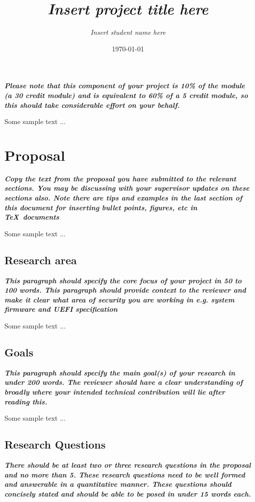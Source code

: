\documentclass{article} %
\title{\emph{Insert project title here}}  %
\author{\emph{Insert student name here}} %
\date{\today}
\newcommand{\hint}[1] {\par {\bfseries \color{Blue} \it #1 \par}}
\begin{document}
\maketitle
\hint{Please note that this component of your project is 10\% of the module (a 30 credit module) and is equivalent to 60\% of a 5 credit module, so this should take considerable effort on your behalf.}
Some sample text ...

\section{Proposal}
\hint{Copy the text from the proposal you have submitted to the relevant sections. You may be discussing with your supervisor updates on these sections also. Note there are tips and examples in the last section of this document for inserting bullet points, figures, etc in \TeX\ documents}

Some sample text ...

\subsection{Research area}
\hint{This paragraph should specify the core focus of your project in 50 to 100 words. This paragraph should provide context to the reviewer and make it clear what area of security you are working in e.g. system firmware and UEFI specification}

Some sample text ...

\subsection{Goals}
\hint{This paragraph should specify the main goal(s) of your research in under 200 words. The reviewer should have a clear understanding of broadly where your intended technical contribution will lie after reading this.}

Some sample text ...

\subsection{Research Questions}
\hint{There should be at least two or three research questions in the proposal and no more than 5. These research questions need to be well formed and answerable in a quantitative manner. These questions should concisely stated and should be able to be posed in under 15 words each.}
\end{document}
